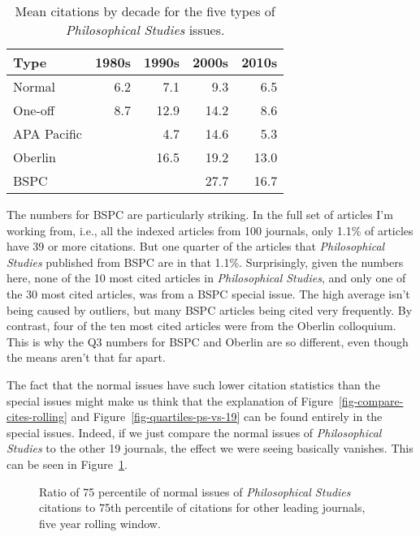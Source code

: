 \documentclass[
  10pt,
  letterpaper,
  DIV=11,
  numbers=noendperiod,
  twoside]{scrartcl}
\begin{document}
\begin{longtable}[]{@{}lrrrr@{}}

\caption{\label{tbl-citation-by-type-decade}Mean citations by decade for
the five types of \emph{Philosophical Studies} issues.}

\tabularnewline

\toprule\noalign{}
Type & 1980s & 1990s & 2000s & 2010s \\
\midrule\noalign{}
\endhead
\bottomrule\noalign{}
\endlastfoot
Normal & 6.2 & 7.1 & 9.3 & 6.5 \\
One-off & 8.7 & 12.9 & 14.2 & 8.6 \\
APA Pacific & & 4.7 & 14.6 & 5.3 \\
Oberlin & & 16.5 & 19.2 & 13.0 \\
BSPC & & & 27.7 & 16.7 \\

\end{longtable}

The numbers for BSPC are particularly striking. In the full set of
articles I'm working from, i.e., all the indexed articles from 100
journals, only 1.1\% of articles have 39 or more citations. But one
quarter of the articles that \emph{Philosophical Studies} published from
BSPC are in that 1.1\%. Surprisingly, given the numbers here, none of
the 10 most cited articles in \emph{Philosophical Studies}, and only one
of the 30 most cited articles, was from a BSPC special issue. The high
average isn't being caused by outliers, but many BSPC articles being
cited very frequently. By contrast, four of the ten most cited articles
were from the Oberlin colloquium. This is why the Q3 numbers for BSPC
and Oberlin are so different, even though the means aren't that far
apart.

The fact that the normal issues have such lower citation statistics than
the special issues might make us think that the explanation of
Figure~\ref{fig-compare-cites-rolling} and
Figure~\ref{fig-quartiles-ps-vs-19} can be found entirely in the special
issues. Indeed, if we just compare the normal issues of
\emph{Philosophical Studies} to the other 19 journals, the effect we
were seeing basically vanishes. This can be seen in
Figure~\ref{fig-quartiles-normal-only}.

\begin{figure}


\caption{\label{fig-quartiles-normal-only}Ratio of 75 percentile of
normal issues of \emph{Philosophical Studies} citations to 75th
percentile of citations for other leading journals, five year rolling
window.}

\end{figure}%
\end{document}
